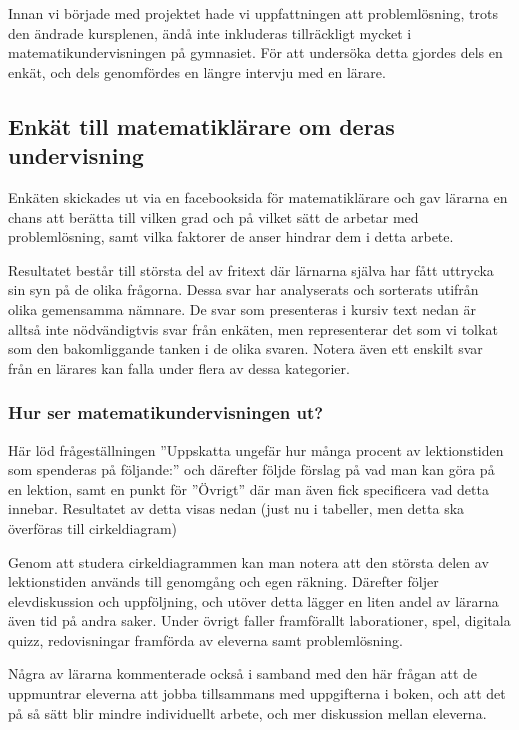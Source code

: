\textcolor{lila}{Innan vi började med projektet hade vi uppfattningen att problemlösning, trots den ändrade kursplenen, ändå inte inkluderas tillräckligt mycket i matematikundervisningen på gymnasiet. För att undersöka detta gjordes dels en enkät, och dels genomfördes en längre intervju med en lärare.} 

\subsection{Enkät till matematiklärare om deras undervisning}
\label{sec:Bakgrunsenkat}
\textcolor{lila}{Enkäten skickades ut via en facebooksida för matematiklärare och gav lärarna en chans att berätta till vilken grad och på vilket sätt de arbetar med problemlösning, samt vilka faktorer de anser hindrar dem i detta arbete.}

\textcolor{lila}{Resultatet består till största del av fritext där lärnarna själva har fått uttrycka sin syn på de olika frågorna. Dessa svar har analyserats och sorterats utifrån olika gemensamma nämnare. De svar som presenteras i kursiv text nedan är alltså inte nödvändigtvis svar från enkäten, men representerar det som vi tolkat som den bakomliggande tanken i de olika svaren. Notera även ett enskilt svar från en lärares kan falla under flera av dessa kategorier.}

\subsubsection{Hur ser matematikundervisningen ut?}

\textcolor{lila}{Här löd frågeställningen ''Uppskatta ungefär hur många procent av lektionstiden som spenderas på följande:'' och därefter följde förslag på vad man kan göra på en lektion, samt en punkt för ''Övrigt'' där man även fick specificera vad detta innebar. Resultatet av detta visas nedan (just nu i tabeller, men detta ska överföras till cirkeldiagram)}



\textcolor{lila}{Genom att studera cirkeldiagrammen kan man notera att den största delen av lektionstiden används till genomgång och egen räkning. Därefter följer elevdiskussion och uppföljning, och utöver detta lägger en liten andel av lärarna även tid på andra saker. Under övrigt faller framförallt laborationer, spel, digitala quizz, redovisningar framförda av eleverna samt problemlösning.}

\textcolor{lila}{Några av lärarna kommenterade också i samband med den här frågan att de uppmuntrar eleverna att jobba tillsammans med uppgifterna i boken, och att det på så sätt blir mindre individuellt arbete, och mer diskussion mellan eleverna.}

